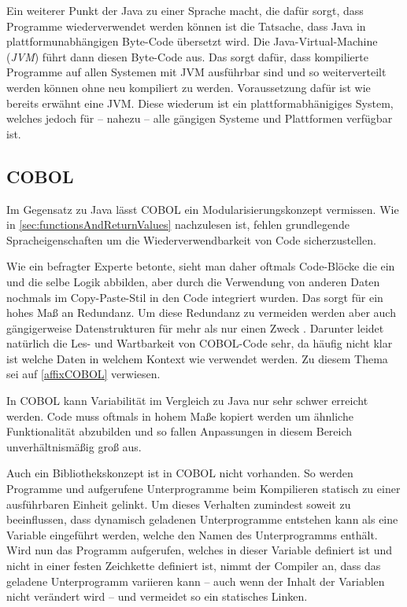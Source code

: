 Ein weiterer Punkt der Java zu einer Sprache macht, die dafür sorgt, dass Programme wiederverwendet werden können ist die Tatsache, dass Java in plattformunabhängigen Byte-Code übersetzt wird. Die Java-Virtual-Machine (\textit{JVM}) führt dann diesen Byte-Code aus. Das sorgt dafür, dass kompilierte Programme auf allen Systemen mit JVM ausführbar sind und so weiterverteilt werden können ohne neu kompiliert zu werden. Voraussetzung dafür ist wie bereits erwähnt eine JVM. Diese wiederum ist ein plattformabhänigiges System, welches jedoch für -- nahezu -- alle gängigen Systeme und Plattformen verfügbar ist.
\subsection*{COBOL}
Im Gegensatz zu Java lässt COBOL ein Modularisierungskonzept vermissen. Wie in \autoref{sec:functionsAndReturnValues} nachzulesen ist, fehlen grundlegende Spracheigenschaften um die Wiederverwendbarkeit von Code sicherzustellen. 

Wie ein befragter Experte betonte, sieht man daher oftmals Code-Blöcke die ein und die selbe Logik abbilden, aber durch die Verwendung von anderen Daten nochmals im Copy-Paste-Stil in den Code integriert wurden. Das sorgt für ein hohes Maß an Redundanz. Um diese Redundanz zu vermeiden werden aber auch gängigerweise Datenstrukturen für mehr als nur einen Zweck . Darunter leidet natürlich die Les- und Wartbarkeit von COBOL-Code sehr, da häufig nicht klar ist welche Daten in welchem Kontext wie verwendet werden. Zu diesem Thema sei auf \autoref{affixCOBOL} verwiesen.

In COBOL kann Variabilität im Vergleich zu Java nur sehr schwer erreicht werden. Code muss oftmals in hohem Maße kopiert werden um ähnliche Funktionalität abzubilden und so fallen Anpassungen in diesem Bereich unverhältnismäßig groß aus.

Auch ein Bibliothekskonzept ist in COBOL nicht vorhanden. So werden Programme und aufgerufene Unterprogramme beim Kompilieren statisch zu einer ausführbaren Einheit gelinkt. Um dieses Verhalten zumindest soweit zu beeinflussen, dass dynamisch geladenen Unterprogramme entstehen kann als  eine Variable eingeführt werden, welche den Namen des Unterprogramms enthält. Wird nun das Programm aufgerufen, welches in dieser Variable definiert ist und nicht in einer festen Zeichkette definiert ist, nimmt der Compiler an, dass das geladene Unterprogramm variieren kann -- auch wenn der Inhalt der Variablen nicht verändert wird -- und vermeidet so ein statisches Linken.

